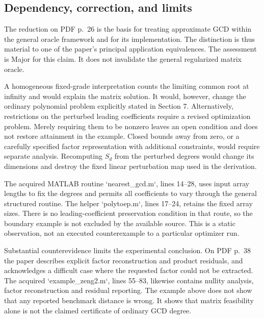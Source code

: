 \documentclass[10pt]{article}
\begin{document}
\subsection*{Dependency, correction, and limits}
The reduction on PDF p. 26 is the basis for treating approximate GCD within the general oracle framework and for its implementation. The distinction is thus material to one of the paper’s principal application equivalences. The assessment is Major for this claim. It does not invalidate the general regularized matrix oracle.\par
A homogeneous fixed-grade interpretation counts the limiting common root at infinity and would explain the matrix solution. It would, however, change the ordinary polynomial problem explicitly stated in Section 7. Alternatively, restrictions on the perturbed leading coefficients require a revised optimization problem. Merely requiring them to be nonzero leaves an open condition and does not restore attainment in the example. Closed bounds away from zero, or a carefully specified factor representation with additional constraints, would require separate analysis. Recomputing \(S_d\) from the perturbed degrees would change its dimensions and destroy the fixed linear perturbation map used in the derivation.\par
The acquired MATLAB routine `nearest\_gcd.m`, lines 14–28, uses input array lengths to fix the degrees and permits all coefficients to vary through the general structured routine. The helper `polytoep.m`, lines 17–24, retains the fixed array sizes. There is no leading-coefficient preservation condition in that route, so the boundary example is not excluded by the available source. This is a static observation, not an executed counterexample to a particular optimizer run.\par
Substantial counterevidence limits the experimental conclusion. On PDF p. 38 the paper describes explicit factor reconstruction and product residuals, and acknowledges a difficult case where the requested factor could not be extracted. The acquired `example\_zeng2.m`, lines 55–83, likewise contains nullity analysis, factor reconstruction and residual reporting. The example above does not show that any reported benchmark distance is wrong. It shows that matrix feasibility alone is not the claimed certificate of ordinary GCD degree.\par
\end{document}
